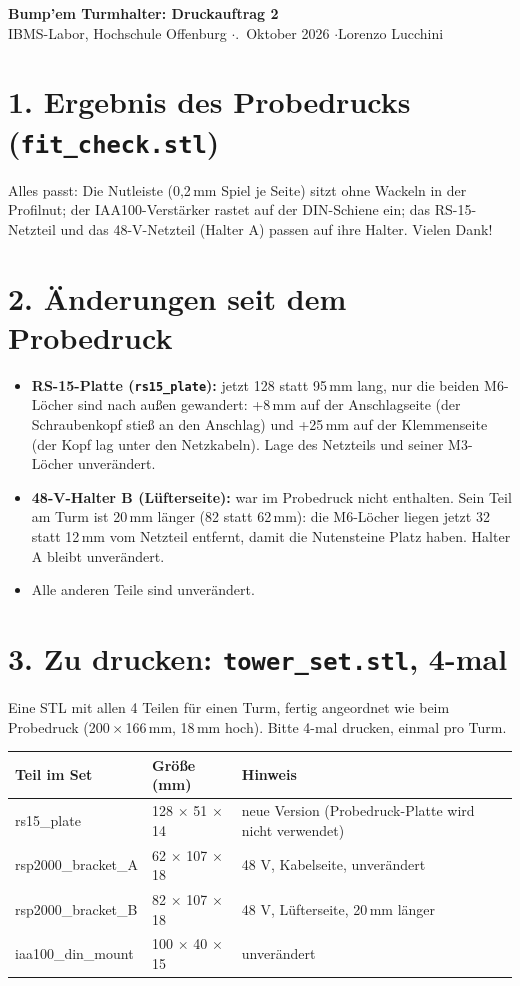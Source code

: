 \documentclass[10pt,a4paper]{article}
\begin{document}
{\Large\textbf{Bump'em Turmhalter: Druckauftrag 2}}\\[2pt]
IBMS-Labor, Hochschule Offenburg \quad$\cdot$.~Oktober 2026 \quad$\cdot$\quad Lorenzo Lucchini

\section*{1. Ergebnis des Probedrucks (\texttt{fit\_check.stl})}
Alles passt: Die Nutleiste (0,2\,mm Spiel je Seite) sitzt ohne Wackeln in der Profilnut; der IAA100-Verstärker rastet auf der
DIN-Schiene ein; das RS-15-Netzteil und das 48-V-Netzteil (Halter A) passen auf ihre Halter. Vielen Dank!

\section*{2. Änderungen seit dem Probedruck}
\begin{itemize}
\item \textbf{RS-15-Platte (\texttt{rs15\_plate}):} jetzt 128 statt 95\,mm lang, nur die beiden M6-Löcher sind nach außen
  gewandert: +8\,mm auf der Anschlagseite (der Schraubenkopf stieß an den Anschlag) und +25\,mm auf der Klemmenseite
  (der Kopf lag unter den Netzkabeln). Lage des Netzteils und seiner M3-Löcher unverändert.
\item \textbf{48-V-Halter B (Lüfterseite):} war im Probedruck nicht enthalten. Sein Teil am Turm ist 20\,mm länger (82 statt 62\,mm): die M6-Löcher liegen jetzt 32 statt 12\,mm vom
  Netzteil entfernt, damit die Nutensteine Platz haben. Halter A bleibt unverändert.
\item Alle anderen Teile sind unverändert.
\end{itemize}

\section*{3. Zu drucken: \texttt{tower\_set.stl}, \textbf{4-mal}}
Eine STL mit allen 4 Teilen für einen Turm, fertig angeordnet wie beim Probedruck (200\,$\times$\,166\,mm, 18\,mm hoch).
Bitte 4-mal drucken, einmal pro Turm.

\begin{tabularx}{\linewidth}{>{\ttfamily}l l X}
\toprule
\normalfont\textbf{Teil im Set} & \textbf{Größe (mm)} & \textbf{Hinweis} \\
\midrule
rs15\_plate & 128 $\times$ 51 $\times$ 14 & neue Version (Probedruck-Platte wird nicht verwendet) \\
rsp2000\_bracket\_A & 62 $\times$ 107 $\times$ 18 & 48 V, Kabelseite, unverändert \\
rsp2000\_bracket\_B & 82 $\times$ 107 $\times$ 18 & 48 V, Lüfterseite, 20\,mm länger \\
iaa100\_din\_mount & 100 $\times$ 40 $\times$ 15 & unverändert \\
\bottomrule
\end{tabularx}
\end{document}
